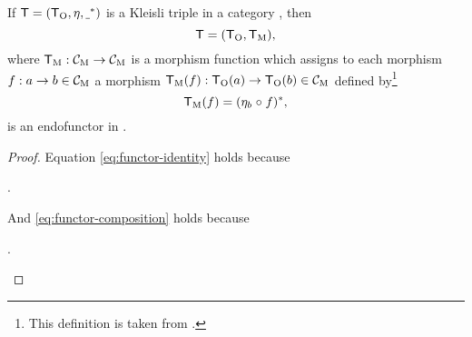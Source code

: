 \begin{proposition}
  \label{prop:triple-to-endofunctor}

  If $\mathsf{T} = (\mathsf{T}_{\operatorname{O}}, \eta, \underline{~}^*)$ is a Kleisli triple in
  a category , then
  \begin{equation*}
    \mathsf{T} = (\mathsf{T}_{\operatorname{O}}, \mathsf{T}_{\operatorname{M}})
    \text{,}
  \end{equation*}
  where $\mathsf{T}_{\operatorname{M}}: \mathcal{C}_{\operatorname{M}} \to \mathcal{C}_{\operatorname{M}}$ is a morphism function
  which assigns to each morphism $f: a \to b \in \mathcal{C}_{\operatorname{M}}$ a morphism
  $\mathsf{T}_{\operatorname{M}}(f): \mathsf{T}_{\operatorname{O}}(a) \to \mathsf{T}_{\operatorname{O}}(b) \in \mathcal{C}_{\operatorname{M}}$ defined
  by\footnote{This definition is taken from
    \parencite[61]{moggi-1991}.}
  \begin{equation}
    \label{eq:triple-to-endofunctor-morphism-function}
    \mathsf{T}_{\operatorname{M}}(f) = (\eta_{b} \mathrel{\circ} f)^*
    \text{,}
  \end{equation}
  is an endofunctor in .

  \begin{proof}

    Equation \eqref{eq:functor-identity} holds because
    \begin{steps}
      .
    \end{steps}
    And \eqref{eq:functor-composition} holds because
    \begin{steps}
      .
    \end{steps}

  \end{proof}

\end{proposition}

